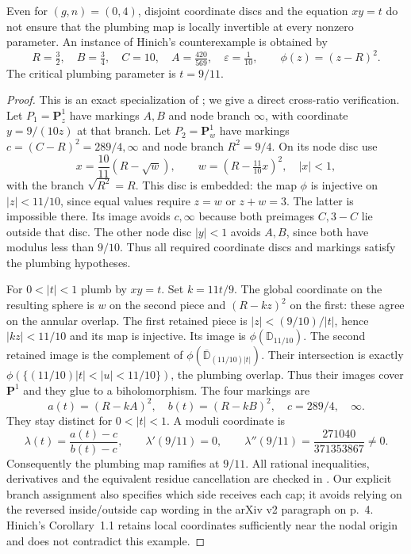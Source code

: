 \begin{proposition}\label{A1-hinich-counterexample}
Even for $(g,n)=(0,4)$, disjoint coordinate discs and the equation $xy=t$ do not ensure that the plumbing map is locally invertible at every nonzero parameter. An instance of Hinich's counterexample is obtained by
\[
 R=\tfrac32,\quad B=\tfrac34,\quad C=10,\quad
 A=\tfrac{420}{569},\quad \varepsilon=\tfrac1{10},
 \qquad \phi(z)=(z-R)^2.
\]
The critical plumbing parameter is $t=9/11$.
\end{proposition}
\begin{proof}
This is an exact specialization of \cite[\S\S2.1--2.3]{AHinich2010}; we give a direct cross-ratio verification. Let $P_1=\mathbf P^1_z$ have markings $A,B$ and node branch $\infty$, with coordinate $y=9/(10z)$ at that branch. Let $P_2=\mathbf P^1_w$ have markings $c=(C-R)^2=289/4,\infty$ and node branch $R^2=9/4$. On its node disc use
\[
 x=\frac{10}{11}(R-\sqrt w),\qquad
 w=(R-\tfrac{11}{10}x)^2,\quad |x|<1,
\]
with the branch $\sqrt{R^2}=R$. This disc is embedded: the map $\phi$ is injective on $|z|<11/10$, since equal values require $z=w$ or $z+w=3$. The latter is impossible there. Its image avoids $c,\infty$ because both preimages $C,3-C$ lie outside that disc. The other node disc $|y|<1$ avoids $A,B$, since both have modulus less than $9/10$. Thus all required coordinate discs and markings satisfy the plumbing hypotheses.

For $0<|t|<1$ plumb by $xy=t$. Set $k=11t/9$. The global coordinate on the resulting sphere is $w$ on the second piece and $(R-kz)^2$ on the first: these agree on the annular overlap. The first retained piece is $|z|<(9/10)/|t|$, hence $|kz|<11/10$ and its map is injective. Its image is $\phi(\mathbb D_{11/10})$. The second retained image is the complement of $\phi(\overline{\mathbb D}_{(11/10)|t|})$. Their intersection is exactly $\phi(\{(11/10)|t|<|u|<11/10\})$, the plumbing overlap. Thus their images cover $\mathbf P^1$ and they glue to a biholomorphism. The four markings are
\[
 a(t)=(R-kA)^2,\quad b(t)=(R-kB)^2,\quad c=289/4,\quad\infty.
\]
They stay distinct for $0<|t|<1$. A moduli coordinate is
\[
 \lambda(t)=\frac{a(t)-c}{b(t)-c},\qquad
 \lambda'(9/11)=0,\qquad
 \lambda''(9/11)=\frac{271040}{371353867}\ne0.
\]
Consequently the plumbing map ramifies at $9/11$. All rational inequalities, derivatives and the equivalent residue cancellation are checked in . Our explicit branch assignment also specifies which side receives each cap; it avoids relying on the reversed inside/outside cap wording in the arXiv v2 paragraph on p.~4. Hinich's Corollary~1.1 retains local coordinates sufficiently near the nodal origin and does not contradict this example.
\end{proof}

